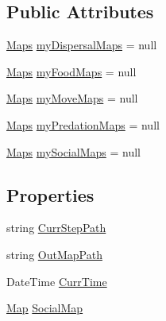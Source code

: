 \subsection*{Public Attributes}
\begin{DoxyCompactItemize}
\item 
\hyperlink{class_p_a_z___dispersal_1_1_maps}{Maps} \hyperlink{class_p_a_z___dispersal_1_1_map_manager_a46ed368f21eb7204a1061f967a1fea61}{my\-Dispersal\-Maps} = null
\item 
\hyperlink{class_p_a_z___dispersal_1_1_maps}{Maps} \hyperlink{class_p_a_z___dispersal_1_1_map_manager_a16be6a0f305cb26685248eb2b658d470}{my\-Food\-Maps} = null
\item 
\hyperlink{class_p_a_z___dispersal_1_1_maps}{Maps} \hyperlink{class_p_a_z___dispersal_1_1_map_manager_a29890f2edf688c9d8074c958b975bf69}{my\-Move\-Maps} = null
\item 
\hyperlink{class_p_a_z___dispersal_1_1_maps}{Maps} \hyperlink{class_p_a_z___dispersal_1_1_map_manager_a9259a49d2d326fbe475c174c570e8dd9}{my\-Predation\-Maps} = null
\item 
\hyperlink{class_p_a_z___dispersal_1_1_maps}{Maps} \hyperlink{class_p_a_z___dispersal_1_1_map_manager_aecd0f430db82d40e85e3a22fa35df2f5}{my\-Social\-Maps} = null
\end{DoxyCompactItemize}
\subsection*{Properties}
\begin{DoxyCompactItemize}
\item 
string \hyperlink{class_p_a_z___dispersal_1_1_map_manager_ab34e661a959f5acd4315c7e9a9623176}{Curr\-Step\-Path}
\item 
string \hyperlink{class_p_a_z___dispersal_1_1_map_manager_acbccb9e68a2dbc494b018372a07bc24b}{Out\-Map\-Path}
\item 
Date\-Time \hyperlink{class_p_a_z___dispersal_1_1_map_manager_a13778e64a53b47dd98652a98076fc5da}{Curr\-Time}
\item 
\hyperlink{class_p_a_z___dispersal_1_1_map}{Map} \hyperlink{class_p_a_z___dispersal_1_1_map_manager_aa28bad04a98c0e53ab03c435ae31f6aa}{Social\-Map}
\end{DoxyCompactItemize}


